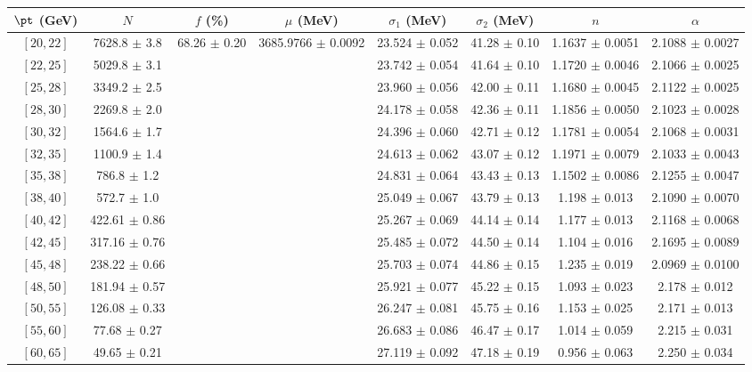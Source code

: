 \begin{tabular}{c||c|c|c|c|c|c|c}
$\pt$ (GeV) & $N$ & $f$ (\%) & $\mu$ (MeV) & $\sigma_1$ (MeV) & $\sigma_2$ (MeV) & $n$ & $\alpha$ \\
\hline
$[20, 22]$ & 7628.8 $\pm$ 3.8 & \multirow{20}{*}{68.26 $\pm$ 0.20} & \multirow{20}{*}{3685.9766 $\pm$ 0.0092} & 23.524 $\pm$ 0.052 & 41.28 $\pm$ 0.10 & 1.1637 $\pm$ 0.0051 & 2.1088 $\pm$ 0.0027\\
$[22, 25]$ & 5029.8 $\pm$ 3.1 &  &  & 23.742 $\pm$ 0.054 & 41.64 $\pm$ 0.10 & 1.1720 $\pm$ 0.0046 & 2.1066 $\pm$ 0.0025\\
$[25, 28]$ & 3349.2 $\pm$ 2.5 &  &  & 23.960 $\pm$ 0.056 & 42.00 $\pm$ 0.11 & 1.1680 $\pm$ 0.0045 & 2.1122 $\pm$ 0.0025\\
$[28, 30]$ & 2269.8 $\pm$ 2.0 &  &  & 24.178 $\pm$ 0.058 & 42.36 $\pm$ 0.11 & 1.1856 $\pm$ 0.0050 & 2.1023 $\pm$ 0.0028\\
$[30, 32]$ & 1564.6 $\pm$ 1.7 &  &  & 24.396 $\pm$ 0.060 & 42.71 $\pm$ 0.12 & 1.1781 $\pm$ 0.0054 & 2.1068 $\pm$ 0.0031\\
$[32, 35]$ & 1100.9 $\pm$ 1.4 &  &  & 24.613 $\pm$ 0.062 & 43.07 $\pm$ 0.12 & 1.1971 $\pm$ 0.0079 & 2.1033 $\pm$ 0.0043\\
$[35, 38]$ & 786.8 $\pm$ 1.2 &  &  & 24.831 $\pm$ 0.064 & 43.43 $\pm$ 0.13 & 1.1502 $\pm$ 0.0086 & 2.1255 $\pm$ 0.0047\\
$[38, 40]$ & 572.7 $\pm$ 1.0 &  &  & 25.049 $\pm$ 0.067 & 43.79 $\pm$ 0.13 & 1.198 $\pm$ 0.013 & 2.1090 $\pm$ 0.0070\\
$[40, 42]$ & 422.61 $\pm$ 0.86 &  &  & 25.267 $\pm$ 0.069 & 44.14 $\pm$ 0.14 & 1.177 $\pm$ 0.013 & 2.1168 $\pm$ 0.0068\\
$[42, 45]$ & 317.16 $\pm$ 0.76 &  &  & 25.485 $\pm$ 0.072 & 44.50 $\pm$ 0.14 & 1.104 $\pm$ 0.016 & 2.1695 $\pm$ 0.0089\\
$[45, 48]$ & 238.22 $\pm$ 0.66 &  &  & 25.703 $\pm$ 0.074 & 44.86 $\pm$ 0.15 & 1.235 $\pm$ 0.019 & 2.0969 $\pm$ 0.0100\\
$[48, 50]$ & 181.94 $\pm$ 0.57 &  &  & 25.921 $\pm$ 0.077 & 45.22 $\pm$ 0.15 & 1.093 $\pm$ 0.023 & 2.178 $\pm$ 0.012\\
$[50, 55]$ & 126.08 $\pm$ 0.33 &  &  & 26.247 $\pm$ 0.081 & 45.75 $\pm$ 0.16 & 1.153 $\pm$ 0.025 & 2.171 $\pm$ 0.013\\
$[55, 60]$ & 77.68 $\pm$ 0.27 &  &  & 26.683 $\pm$ 0.086 & 46.47 $\pm$ 0.17 & 1.014 $\pm$ 0.059 & 2.215 $\pm$ 0.031\\
$[60, 65]$ & 49.65 $\pm$ 0.21 &  &  & 27.119 $\pm$ 0.092 & 47.18 $\pm$ 0.19 & 0.956 $\pm$ 0.063 & 2.250 $\pm$ 0.034\\

\end{tabular}

